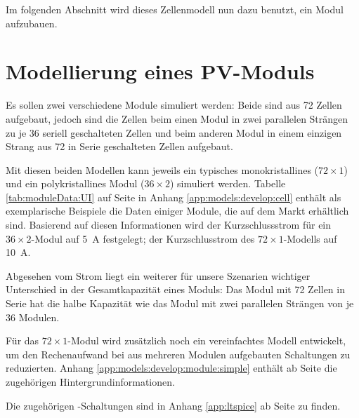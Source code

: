 Im folgenden Abschnitt wird dieses Zellenmodell nun dazu benutzt, ein Modul
aufzubauen.


\clearpage
\section{Modellierung eines PV-Moduls}
\label{sec:simu:model:module}

Es sollen zwei verschiedene Module  simuliert werden: Beide sind aus 72 Zellen
aufgebaut,  jedoch  sind  die  Zellen  beim einen  Modul  in  zwei  parallelen
Str\"angen zu  je 36  seriell geschalteten  Zellen und  beim anderen  Modul in
einem einzigen Strang aus 72 in Serie geschalteten Zellen aufgebaut.

Mit  diesen  beiden  Modellen  kann  jeweils  ein  typisches  monokristallines
($72  \times 1$)  und ein  polykristallines  Modul ($36  \times 2$)  simuliert
werden. Tabelle \ref{tab:moduleData:UI}  auf Seite \pageref{tab:moduleData:UI}
in Anhang \ref{app:models:develop:cell}  enth\"alt als exemplarische Beispiele
die Daten einiger  Module, die auf dem Markt  erh\"altlich sind. Basierend auf
diesen Informationen wird  der Kurzschlussstrom f\"ur ein  $36 \times 2$-Modul
auf \SI{5}{\ampere} festgelegt; der  Kurzschlusstrom des $72 \times 1$-Modells
auf \SI{10}{\ampere}.

Abgesehen  vom  Strom liegt  ein  weiterer  f\"ur unsere  Szenarien  wichtiger
Unterschied in der Gesamtkapazit\"at eines  Moduls: Das Modul mit 72 Zellen in
Serie hat die  halbe Kapazit\"at wie das Modul mit  zwei parallelen Str\"angen
von je 36 Modulen.

F\"ur  das  $72  \times  1$-Modul wird  zus\"atzlich  noch  ein  vereinfachtes
Modell entwickelt, um  den Rechenaufwand bei aus  mehreren Modulen aufgebauten
Schaltungen   zu  reduzierten. Anhang   \ref{app:models:develop:module:simple}
enth\"alt    ab     Seite    \pageref{app:models:develop:module:simple}    die
zugeh\"origen Hintergrundinformationen.

Die zugeh\"origen -Schaltungen  sind in Anhang \ref{app:ltspice}
ab Seite \pageref{app:ltspice} zu finden.


\begin{figure}[h!tb]
    
    
\end{figure}


